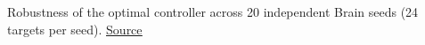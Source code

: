 Robustness of the optimal controller across 20 independent Brain seeds (24 targets per seed). \href{https://github.com/tahmidazam/gg4/blob/main/notebooks/cartesian_control_robustness/cartesian_control_robustness.ipynb}{\underline{Source}}%